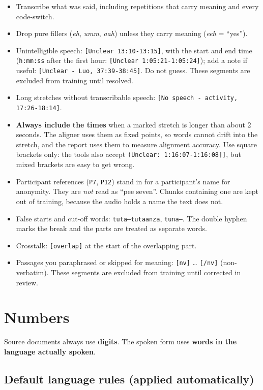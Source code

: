 \documentclass[11pt]{article}
\begin{document}
\begin{itemize}
\tightlist
\item
  Transcribe what was said, including repetitions that carry meaning and every code-switch.
\item
  Drop pure fillers (\emph{eh}, \emph{umm}, \emph{aah}) unless they carry meaning (\emph{eeh} = ``yes'').
\item
  Unintelligible speech: \texttt{[Unclear 13:10-13:15]}, with the start and end time (\texttt{h:mm:ss} after the first hour: \texttt{[Unclear 1:05:21-1:05:24]}); add a note if useful: \texttt{[Unclear - Luo, 37:39-38:45]}. Do not guess. These segments are excluded from training until resolved.
\item
  Long stretches without transcribable speech: \texttt{[No speech - activity, 17:26-18:14]}.
\item
  \textbf{Always include the times} when a marked stretch is longer than about 2 seconds. The aligner uses them as fixed points, so words cannot drift into the stretch, and the report uses them to measure alignment accuracy. Use square brackets only: the tools also accept \texttt{(Unclear: 1:16:07-1:16:08]]}, but mixed brackets are easy to get wrong.
\item
  Participant references (\texttt{P7}, \texttt{P12}) stand in for a participant's name for anonymity. They are \emph{not} read as ``pee seven''. Chunks containing one are kept out of training, because the audio holds a name the text does not.
\item
  False starts and cut-off words: \texttt{tuta--tutaanza}, \texttt{tuna--}. The double hyphen marks the break and the parts are treated as separate words.
\item
  Crosstalk: \texttt{[overlap]} at the start of the overlapping part.
\item
  Passages you paraphrased or skipped for meaning: \texttt{[nv]} \ldots{} \texttt{[/\allowbreak{}nv]} (non-verbatim). These segments are excluded from training until corrected in review.
\end{itemize}

\hypertarget{numbers}{%
\section{Numbers}\label{numbers}}

Source documents always use \textbf{digits}. The spoken form uses \textbf{words in the language actually spoken}.

\hypertarget{default-language-rules-applied-automatically}{%
\subsection{Default language rules (applied automatically)}\label{default-language-rules-applied-automatically}}
\end{document}
